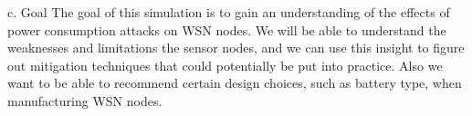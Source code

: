 c. Goal
The goal of this simulation is to gain an understanding of the effects of power consumption attacks on WSN nodes. We will be able to understand the weaknesses and limitations the sensor nodes, and we can use this insight to figure out mitigation techniques that could potentially be put into practice. Also we want to be able to recommend certain design choices, such as battery type, when manufacturing WSN nodes.

